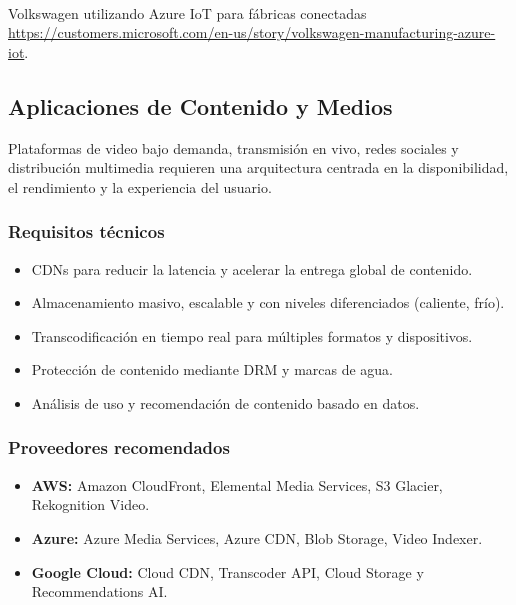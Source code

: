 {                \paragraph{}Volkswagen utilizando Azure IoT para fábricas conectadas \href{https://customers.microsoft.com/en-us/story/volkswagen-manufacturing-azure-iot}{https://customers.microsoft.com/en-us/story/volkswagen-manufacturing-azure-iot}.
       
        \subsection{Aplicaciones de Contenido y Medios}
            Plataformas de video bajo demanda, transmisión en vivo, redes sociales y distribución multimedia requieren una arquitectura centrada en la disponibilidad, el rendimiento y la experiencia del usuario.
                
            \subsubsection{Requisitos técnicos}
                \begin{itemize}
                    \item CDNs para reducir la latencia y acelerar la entrega global de contenido.
                    \item Almacenamiento masivo, escalable y con niveles diferenciados (caliente, frío).
                    \item Transcodificación en tiempo real para múltiples formatos y dispositivos.
                    \item Protección de contenido mediante DRM y marcas de agua.
                    \item Análisis de uso y recomendación de contenido basado en datos.
                \end{itemize}
                
            \subsubsection{Proveedores recomendados}
                \begin{itemize}
                    \item \textbf{AWS:} Amazon CloudFront, Elemental Media Services, S3 Glacier, Rekognition Video.
                    \item \textbf{Azure:} Azure Media Services, Azure CDN, Blob Storage, Video Indexer.
                    \item \textbf{Google Cloud:} Cloud CDN, Transcoder API, Cloud Storage y Recommendations AI.
                \end{itemize}
                
}
